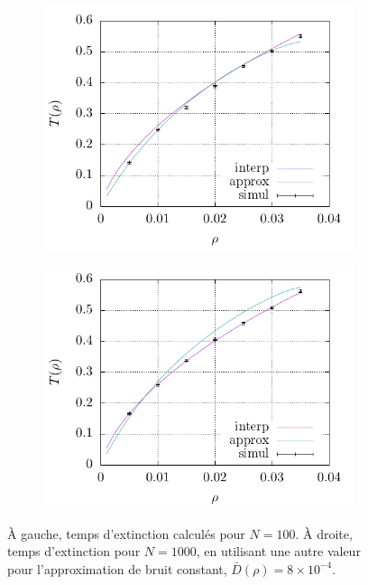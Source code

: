 \documentclass[openany,a4paper,12pt]{article}
\begin{document}
\begin{figure}[t]
	\centering
	\begin{subfigure}{0.5\linewidth}
		\centering
		\includegraphics[width=\linewidth]{figures/extc_time_comparison_N100}
	\end{subfigure}%
	\begin{subfigure}{0.5\linewidth}
		\centering
		\includegraphics[width=\linewidth]{figures/extc_time_comparison_approx_00008}
	\end{subfigure}
	\caption{À gauche, temps d'extinction calculés pour $N=100$. À droite, temps d'extinction pour $N=1000$, en utilisant une autre valeur pour l'approximation de bruit constant, $\bar D(\rho) = 8\times 10^{-4}$.}
	\label{fig:qualite_selon_N_D}
\end{figure}
\end{document}
